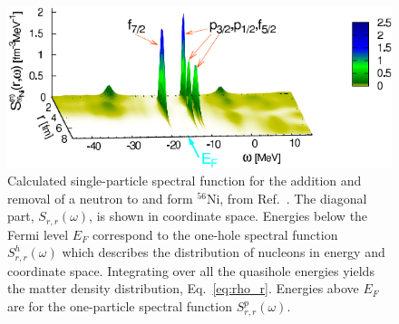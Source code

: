 \begin{figure}[t]
\begin{center}
\includegraphics[height=0.38\textwidth]{Chapter11-figures/Fig_Ni56_SctFn.pdf}
\caption{
Calculated single-particle spectral function for the addition and removal of a neutron to and form $^{56}$Ni, from Ref.~\cite{ch11_Barbieri2009Ni}. The diagonal part, $S_{r,r}(\omega)$, is
shown in coordinate space. Energies below the Fermi level $E_F$ correspond to the  one-hole spectral function $S^h_{r,r}(\omega)$  which describes
the distribution of nucleons in energy and coordinate space. Integrating over all the quasihole energies yields the matter  density distribution, Eq.~\eqref{eq:rho_r}.
Energies above $E_F$ are for the one-particle spectral function $S^p_{r,r}(\omega)$.}
\label{fig:ScptFnctN56}
\end{center}
\end{figure}

